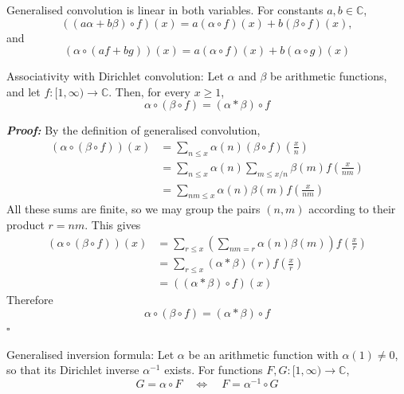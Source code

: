 \documentclass[a4paper,11pt,abstracton]{scrartcl}
\theoremstyle{dotlessP}
\theoremstyle{dotlessS}
\theoremstyle{remark}
\theoremstyle{definition}
\begin{document}
\begin{remark_box}
Generalised convolution is linear in both variables. For constants
$a,b\in\mathbb{C}$,
\[
    ((a\alpha+b\beta)\circ f)(x)
      =a(\alpha\circ f)(x)+b(\beta\circ f)(x),
\]
and
\[
    (\alpha\circ(af+bg))(x)
      =a(\alpha\circ f)(x)+b(\alpha\circ g)(x)
\]
\end{remark_box}

\begin{mainbox}{Associativity with Dirichlet convolution:}
Let $\alpha$ and $\beta$ be arithmetic functions, and let
$f:[1,\infty)\to\mathbb{C}$. Then, for every $x\geq1$,
\[
    \alpha\circ(\beta\circ f)
      =(\alpha*\beta)\circ f
\]
\end{mainbox}

\begin{claim_box}
\textbf{\textit{Proof:}}
By the definition of generalised convolution,
\begin{align*}
    (\alpha\circ(\beta\circ f))(x)
      &=\sum_{n\leq x}\alpha(n)
        (\beta\circ f)\!\left(\frac xn\right)\\
      &=\sum_{n\leq x}\alpha(n)
        \sum_{m\leq x/n}\beta(m)
        f\!\left(\frac{x}{nm}\right)\\
      &=\sum_{nm\leq x}\alpha(n)\beta(m)
        f\!\left(\frac{x}{nm}\right)
\end{align*}
All these sums are finite, so we may group the pairs $(n,m)$ according
to their product $r=nm$. This gives
\begin{align*}
    (\alpha\circ(\beta\circ f))(x)
      &=\sum_{r\leq x}
        \left(\sum_{nm=r}\alpha(n)\beta(m)\right)
        f\!\left(\frac xr\right)\\
      &=\sum_{r\leq x}(\alpha*\beta)(r)
        f\!\left(\frac xr\right)\\
      &=((\alpha*\beta)\circ f)(x)
\end{align*}
Therefore
\[
    \alpha\circ(\beta\circ f)=(\alpha*\beta)\circ f
\]
\hfill$\square$
\end{claim_box}

\begin{mainbox}{Generalised inversion formula:}
Let $\alpha$ be an arithmetic function with $\alpha(1)\neq0$, so that
its Dirichlet inverse $\alpha^{-1}$ exists. For functions
$F,G:[1,\infty)\to\mathbb{C}$,
\[
    G=\alpha\circ F
      \quad\Longleftrightarrow\quad
      F=\alpha^{-1}\circ G
\]
\end{mainbox}
\end{document}
